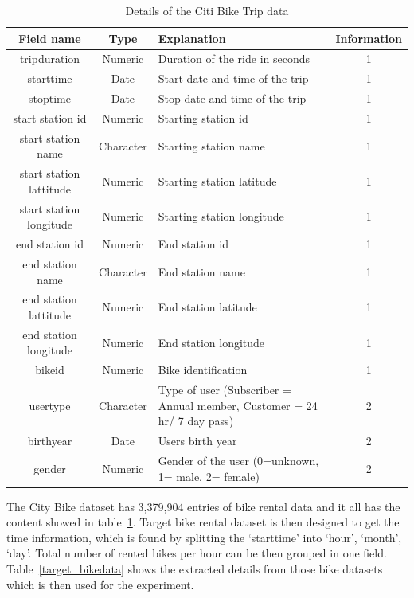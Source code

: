 \begin{table}
\centering
\caption{Details of the Citi Bike Trip data }
\label{bikedata}
\vspace{1ex}
\begin{tabular}{||c||c |p{6.5cm} |c||}\hline
Field name & Type  &  Explanation & Information  \\\hline\hline
tripduration & Numeric & Duration of the ride in seconds & 1 \\\hline
starttime& Date& Start date and time of the trip  & 1 \\\hline
stoptime&Date &Stop date and time of the trip & 1 \\\hline
start station id&Numeric & Starting station id & 1 \\\hline
start station name& Character& Starting station name& 1 \\\hline
start station lattitude& Numeric& Starting station latitude& 1 \\\hline
start station longitude&Numeric &Starting station longitude & 1 \\\hline
end station id&Numeric &End station id & 1 \\\hline
end station name&Character &End station name & 1 \\\hline
end station lattitude&Numeric &End station latitude & 1 \\\hline
end station longitude&Numeric &End station longitude & 1 \\\hline
bikeid& Numeric& Bike identification& 1 \\\hline
usertype& Character& Type of user (Subscriber = Annual member, Customer = 24 hr/ 7 day pass) & 2 \\\hline
birthyear&Date &Users birth year & 2 \\\hline
gender& Numeric& Gender of the user (0=unknown, 1= male, 2= female)& 2\\\hline
\end{tabular}
\end{table}


The City Bike dataset has 3,379,904 entries of bike rental data and it all has the content showed in table~\ref{bikedata}.  Target bike rental dataset is then designed to get the time information, which is found by splitting the `starttime' into `hour', `month', `day'. Total number of rented bikes per hour can be then grouped in one field. Table~\ref{target_bikedata} shows the extracted details from those bike datasets which is then used for the experiment. 


